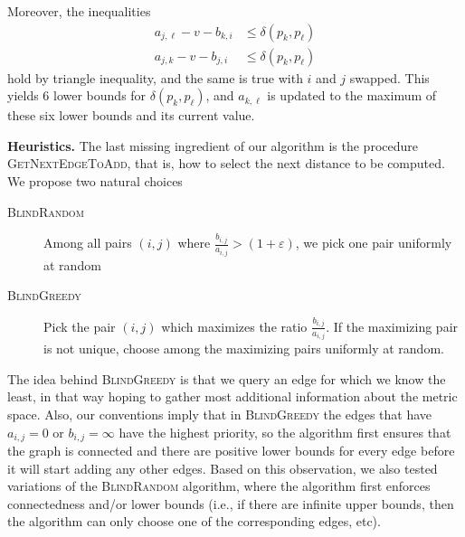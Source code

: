 \documentclass[a4paper,UKenglish,cleveref, autoref]{lipics-v2019}
\newcommand{\eps}{\varepsilon}
\newcommand{\dist}{\delta}
\newcommand{\myparagraph}[1]{\textbf{#1.}}
\def\marrow{\marginpar[\hfill$\longrightarrow$]{$\longleftarrow$}}
\def\michael#1{\textcolor{red}{\textsc{Michael says: }{\marrow\sf #1}}}
\begin{document}
Moreover, the inequalities
\begin{align*}
  a_{j,\ell} - v - b_{k,i}&\leq \dist(p_k,p_\ell)\\
  a_{j,k} - v - b_{j,i}&\leq \dist(p_k,p_\ell)
\end{align*}
hold by triangle inequality, and the same is true with $i$ and $j$ swapped.
This yields $6$ lower bounds for $\dist(p_k,p_\ell)$, and $a_{k,\ell}$
is updated to the maximum of these six lower bounds and its current value.

\myparagraph{Heuristics}
%
The last missing ingredient of our algorithm is the procedure \textsc{GetNextEdgeToAdd},
that is, how to select the next distance to be computed. We propose two natural choices

\begin{description}
\item[\textsc{BlindRandom}] Among all pairs $(i,j)$ where $\frac{b_{i,j}}{a_{i,j}}>(1+\eps)$,
we pick one pair uniformly at random
\item[\textsc{BlindGreedy}] Pick the pair $(i,j)$ which maximizes the ratio $\frac{b_{i,j}}{a_{i,j}}$.
If the maximizing pair is not unique, choose among the maximizing pairs uniformly at random.
\end{description}
%
The idea behind \textsc{BlindGreedy} is that we query an edge for which we know the least,
in that way hoping to gather most additional information about the metric space.
Also, our conventions imply that in \textsc{BlindGreedy} the edges that have $a_{i,j} = 0$ or $b_{i,j} = \infty$
have the highest priority, so the algorithm first ensures that the graph is connected and there are positive
lower bounds for every edge before it will start adding any other edges. Based on this observation,
we also tested variations of the \textsc{BlindRandom} algorithm, where the algorithm
first enforces connectedness and/or lower bounds (i.e., if there are infinite upper bounds,
then the algorithm can only choose one of the corresponding edges, etc).

\end{document}
